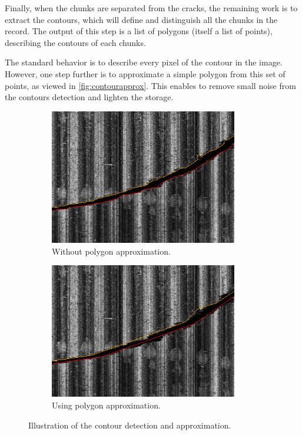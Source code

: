Finally, when the chunks are separated from the cracks, the remaining work is to extract the contours, which will define and distinguish all the chunks in the record. The output of this step is a list of polygons (itself a list of points), describing the contours of each chunks.

The standard behavior is to describe every pixel of the contour in the image. However, one step further is to approximate a simple polygon from this set of points, as viewed in \autoref{fig:contourapprox}. This enables to remove small noise from the contours detection and lighten the storage.

\begin{figure}[!ht]
\centering
    \begin{subfigure}[t]{0.45\textwidth}
    \centering
    \includegraphics[width=0.9\textwidth]{images/approx-without}
    \caption{Without polygon approximation.}
    \label{fig:withoutapprox}
    \end{subfigure}
    \begin{subfigure}[t]{0.45\textwidth}
    \centering
    \includegraphics[width=0.9\textwidth]{images/approx-with}
    \caption{Using polygon approximation.}
    \label{fig:withapprox}
    \end{subfigure}
    \caption{Illustration of the contour detection and approximation.}
    \label{fig:contourapprox}
\end{figure}

